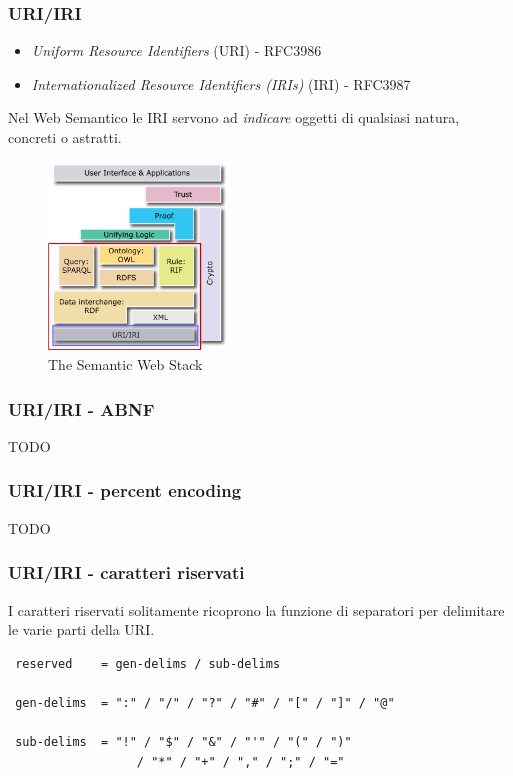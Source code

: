 \documentclass[8pt]{beamer}
\begin{document}
\begin{frame}
	\frametitle{URI/IRI}
	
	\begin{itemize}
	  \item \emph{Uniform Resource Identifiers} (URI) - RFC3986
	  \item \emph{Internationalized Resource Identifiers (IRIs)} (IRI) - RFC3987
	\end{itemize}	
	
	Nel Web Semantico le IRI servono ad \emph{indicare} oggetti di qualsiasi
	natura, concreti o astratti.
	
	\begin{figure}
	    \includegraphics[width=180px]{imgs/Semantic_Web_Stack_uri.png}
	    \caption{The Semantic Web Stack} 
	\end{figure}
\end{frame}

\begin{frame}
	\frametitle{URI/IRI - ABNF}
	TODO
\end{frame}

\begin{frame}
	\frametitle{URI/IRI - percent encoding}
	TODO
\end{frame}

\begin{frame}[fragile]
	\frametitle{URI/IRI - caratteri riservati}
	
	I caratteri riservati solitamente ricoprono la funzione di 
	separatori per delimitare le varie parti della URI.
	
	\begin{verbatim}
 reserved    = gen-delims / sub-delims
 
 gen-delims  = ":" / "/" / "?" / "#" / "[" / "]" / "@"

 sub-delims  = "!" / "$" / "&" / "'" / "(" / ")"
                  / "*" / "+" / "," / ";" / "=" 
	\end{verbatim}
	\vspace{\baselineskip}
	
\end{frame}
\end{document}
